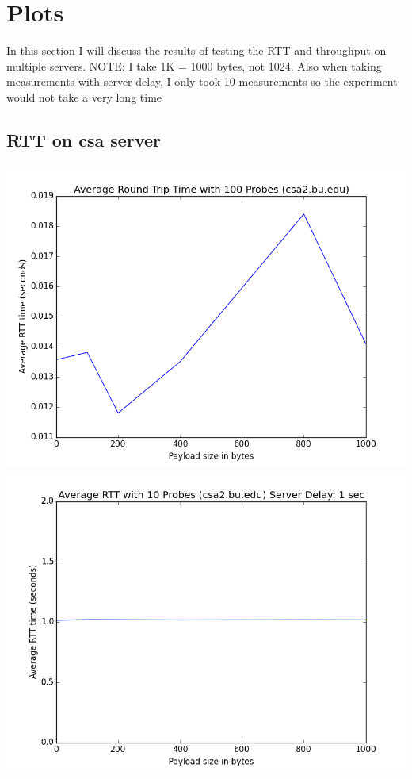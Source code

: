 \documentclass[11pt]{article}
\theoremstyle{definition}
\begin{document}
\section{Plots}
In this section I will discuss the results of testing the RTT and throughput on multiple servers.  NOTE: I take 1K = 1000 bytes, not 1024.  Also when taking measurements with server delay, I only took 10 measurements so the experiment would not take a very long time

\subsection*{RTT on csa server}
\includegraphics[scale=0.4]{rtt_csa}
\includegraphics[scale=0.4]{rtt_csa_sd1}
\end{document}
